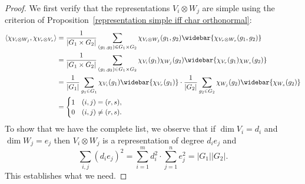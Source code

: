 \begin{proof}
We first verify that the representations $V_i\otimes W_j$ are simple using the criterion of Proposition~\ref{representation simple iff char orthonormal}:
\begin{align*}
\langle\chi_{V_i\otimes W_j},\chi_{V_r\otimes V_s}\rangle&=\frac{1}{|G_1\times G_2|}\sum_{(g_1,g_2)\in G_1\times G_2}\chi_{V_i\otimes W_j}(g_1,g_2)\widebar{\chi_{V_r\otimes W_s}(g_1,g_2)}\\
&=\frac{1}{|G_1\times G_2|}\sum_{(g_1,g_2)\in G_1\times G_2}\chi_{V_i}(g_1)\chi_{W_j}(g_2)\widebar{\chi_{V_r}(g_1)\chi_{W_s}(g_2)}\\
&=\frac{1}{|G_1|}\sum_{g_1\in G_1}\chi_{V_i}(g_1)\widebar{\chi_{V_r}(g_1)}\cdot\frac{1}{|G_2|}\sum_{g_2\in G_2}\chi_{W_j}(g_2)\widebar{\chi_{W_s}(g_2)}\\
&=\begin{cases}
1&(i,j)=(r,s),\\
0&(i,j)\neq(r,s).
\end{cases}
\end{align*}
To show that we have the complete list, we observe that if $\dim V_i=d_i$ and $\dim W_j=e_j$ then $V_i\otimes W_j$ is a representation of degree $d_ie_j$ and
\[\sum_{i,j}(d_ie_j)^2=\sum_{i=1}^{m}d_i^2\cdot\sum_{j=1}^{n}e_j^2=|G_1||G_2|.\]
This establishes what we need.
\end{proof}
